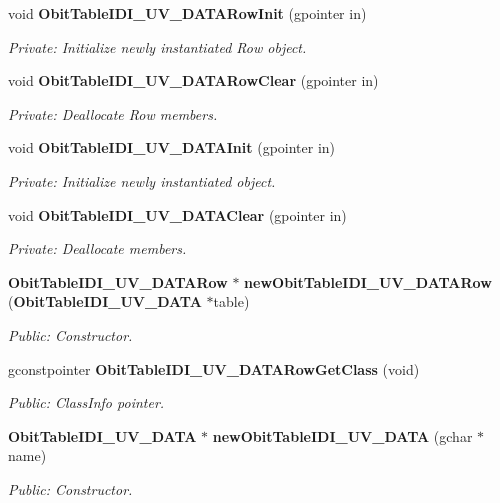 \begin{CompactItemize}
\item 
void {\bf Obit\-Table\-IDI\_\-UV\_\-DATARow\-Init} (gpointer in)
\begin{CompactList}\small\item\em Private: Initialize newly instantiated Row object. \item\end{CompactList}\item 
void {\bf Obit\-Table\-IDI\_\-UV\_\-DATARow\-Clear} (gpointer in)
\begin{CompactList}\small\item\em Private: Deallocate Row members. \item\end{CompactList}\item 
void {\bf Obit\-Table\-IDI\_\-UV\_\-DATAInit} (gpointer in)
\begin{CompactList}\small\item\em Private: Initialize newly instantiated object. \item\end{CompactList}\item 
void {\bf Obit\-Table\-IDI\_\-UV\_\-DATAClear} (gpointer in)
\begin{CompactList}\small\item\em Private: Deallocate members. \item\end{CompactList}\item 
{\bf Obit\-Table\-IDI\_\-UV\_\-DATARow} $\ast$ {\bf new\-Obit\-Table\-IDI\_\-UV\_\-DATARow} ({\bf Obit\-Table\-IDI\_\-UV\_\-DATA} $\ast$table)
\begin{CompactList}\small\item\em Public: Constructor. \item\end{CompactList}\item 
gconstpointer {\bf Obit\-Table\-IDI\_\-UV\_\-DATARow\-Get\-Class} (void)
\begin{CompactList}\small\item\em Public: Class\-Info pointer. \item\end{CompactList}\item 
{\bf Obit\-Table\-IDI\_\-UV\_\-DATA} $\ast$ {\bf new\-Obit\-Table\-IDI\_\-UV\_\-DATA} (gchar $\ast$name)
\begin{CompactList}\small\item\em Public: Constructor. \item\end{CompactList}\item 

\end{CompactItemize}
